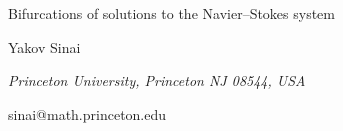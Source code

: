 \documentclass[10pt,a4paper]{article}
\begin{document}
\begin{center}

{\Large Bifurcations of solutions to the Navier--Stokes system}

\bigskip

{\sc Yakov Sinai}

{\small\it Princeton University, Princeton NJ 08544, USA}

{\small\rm sinai@math.princeton.edu}

\end{center}
\end{document}

